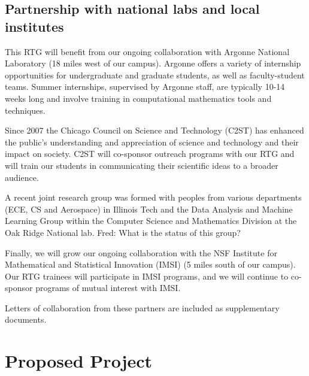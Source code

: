 \documentclass[11pt]{NSFamsart}
\newcommand{\FredNote}[1]{{\color{blue} Fred: #1}}
\begin{document}
\subsection*{Partnership with  national labs and local institutes} 
This RTG will benefit from our ongoing collaboration with Argonne National Laboratory (18 miles west of our campus).  Argonne offers a variety of internship opportunities for undergraduate and graduate students, as well as faculty-student teams. Summer internships, supervised by Argonne staff, are typically 10-14 weeks long and involve training in computational mathematics tools and techniques. %

Since 2007 the Chicago Council on Science and Technology (C2ST) has enhanced the public’s understanding and appreciation of science and technology and their impact on society. C2ST will co-sponsor outreach programs with our RTG and will train our students in communicating their scientific ideas to a broader audience.   

A recent joint research group was formed with peoples from various departments (ECE, CS and Aerospace) in Illinois Tech and the Data Analysis and Machine Learning Group within the Computer Science and Mathematics Division at the Oak Ridge National lab. \FredNote{What is the status of this group?}

Finally, we will grow our ongoing collaboration with the NSF Institute for Mathematical and Statistical Innovation (IMSI) %
(5 miles south of our campus). %
Our RTG trainees will participate in IMSI programs, and we will continue to co-sponsor programs of mutual interest with IMSI. 

Letters of collaboration from these partners are included as supplementary documents.







\section{Proposed Project } 
 
\end{document}
